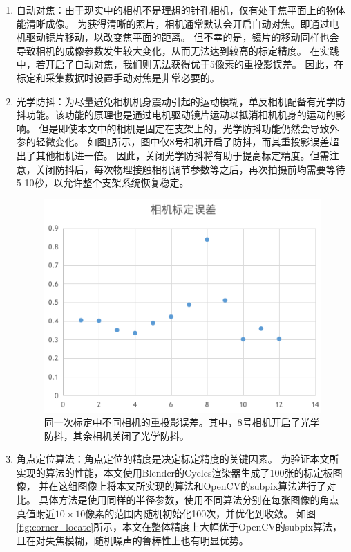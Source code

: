 \documentclass{scutmaster}
\begin{document}
\begin{enumerate}
\item 自动对焦：由于现实中的相机不是理想的针孔相机，仅有处于焦平面上的物体能清晰成像。
为获得清晰的照片，相机通常默认会开启自动对焦。即通过电机驱动镜片移动，以改变焦平面的距离。
但不幸的是，镜片的移动同样也会导致相机的成像参数发生较大变化，从而无法达到较高的标定精度。
在实践中，若开启了自动对焦，我们则无法获得优于5像素的重投影误差。
因此，在标定和采集数据时设置手动对焦是非常必要的。

\item 光学防抖：为尽量避免相机机身震动引起的运动模糊，单反相机配备有光学防抖功能。该功能的原理也是通过电机驱动镜片运动以抵消相机机身的运动的影响。
但是即使本文中的相机是固定在支架上的，光学防抖功能仍然会导致外参的轻微变化。
如图\ref{fig:stablize_ablation}所示，图中仅8号相机开启了防抖，而其重投影误差超出了其他相机进一倍。
因此，关闭光学防抖将有助于提高标定精度。但需注意，关闭防抖后，每次物理接触相机调节参数等之后，再次拍摄前均需要等待5-10秒，以允许整个支架系统恢复稳定。

\begin{figure}
    \centering
    \includegraphics[width=0.8\linewidth]{figures/stablize_ablation}
    \caption[不同相机的重投影误差]{同一次标定中不同相机的重投影误差。其中，8号相机开启了光学防抖，其余相机关闭了光学防抖。}
    \label{fig:stablize_ablation}
\end{figure}

\item 角点定位算法：角点定位的精度是决定标定精度的关键因素。
为验证本文所实现的算法的性能，本文使用Blender的Cycles渲染器生成了100张的标定板图像，
并在这组图像上将本文所实现的算法和OpenCV的subpix算法进行了对比。
具体方法是使用同样的半径参数，使用不同算法分别在每张图像的角点真值附近$10\times 10$像素的范围内随机初始化100次，并优化到收敛。
如图\ref{fig:corner_locate}所示，本文在整体精度上大幅优于OpenCV的subpix算法，且在对失焦模糊，随机噪声的鲁棒性上也有明显优势。


\end{enumerate}
\end{document}
